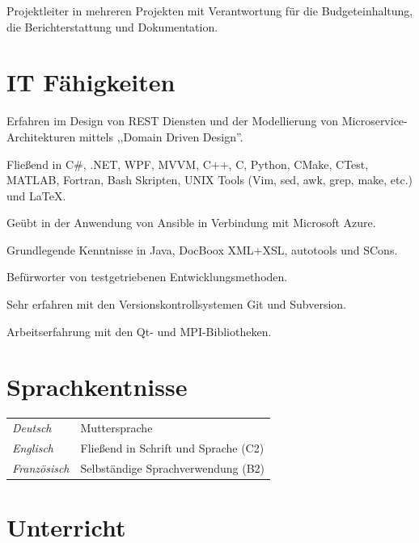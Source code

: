 \documentclass[line,11pt,a4paper]{../resume}
\begin{document}
\begin{resume}
\begin{list2}
  \item Projektleiter in mehreren Projekten mit Verantwortung für die
    Budgeteinhaltung, die Berichterstattung und Dokumentation.
\end{list2}

\section{\mysidestyle IT Fähigkeiten}\vspace{6mm}
\begin{list2}
  \item Erfahren im Design von REST Diensten und der Modellierung von
    Microservice-Architekturen mittels ,,Domain Driven Design''.
  \item Flie{\ss}end in C\#, .NET, WPF, MVVM, C++, C, Python, CMake, CTest,
    MATLAB, Fortran, Bash Skripten, UNIX Tools (Vim, sed, awk, grep, make,
    etc.) und {\selectfont\LaTeX}.
  \item Geübt in der Anwendung von Ansible in Verbindung mit Microsoft Azure.
  \item Grundlegende Kenntnisse in Java, DocBoox XML+XSL, autotools und SCons.
  \item Befürworter von testgetriebenen Entwicklungsmethoden.
  \item Sehr erfahren mit den Versionskontrollsystemen Git und Subversion.
  \item Arbeitserfahrung mit den Qt- und MPI-Bibliotheken.
\end{list2}

\section{\mysidestyle Sprachkentnisse}\vspace{2mm}
\begin{tabular}{@{}ll}
  \textsl{Deutsch}   & Muttersprache \\
  \textsl{Englisch}  & Flie{\ss}end in Schrift und Sprache (C2) \\
  \textsl{Französisch}  & Selbständige Sprachverwendung (B2) \\
\end{tabular}

\section{\mysidestyle Unterricht}\vspace{2mm}


\end{resume}
\end{document}
